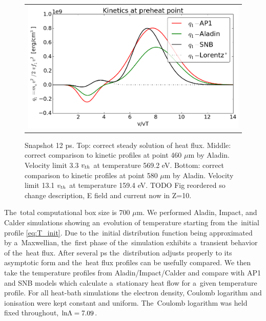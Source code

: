\begin{figure}[htb]
\begin{center}
\begin{tabular}{c}
      \includegraphics[width=\figscale\textwidth]{../VFPdata/C7_Aladin_case3_nonlocal_kinetics.png}  
    \end{tabular}
  \caption{  
  Snapshot 12 ps. Top: correct steady solution of heat flux.  
  Middle: correct comparison to kinetic profiles at point 460 $\mu$m by Aladin. 
  Velocity limit 3.3 $v_{th}$ at temperature 569.2 eV.
  Bottom: correct comparison to kinetic profiles at point 580 $\mu$m by Aladin.
  Velocity limit 13.1 $v_{th}$ at temperature 159.4 eV.
  TODO Fig reordered so change description, E field and current now in Z=10. 
  }
  \label{fig:C7_Aladin_case3}
  \end{center} 
\end{figure}


The~total computational box size is 700 $\mu$m.
We performed Aladin, Impact, and Calder simulations showing an~evolution of
temperature starting from the~initial profile \eqref{eq:T_init}. 
Due to the~initial distribution function being approximated by a~Maxwellian,
the~first phase of the~simulation exhibits a~transient behavior of the~heat
flux. After several ps the~distribution adjusts properly to its asymptotic form
and the~heat flux profiles can be usefully compared. 
We then take the temperature profiles from Aladin/Impact/Calder and compare 
with AP1 and SNB models which calculate a~stationary heat flow
for a~given temperature profile. 
For all heat-bath simulations the electron density, Coulomb logarithm and 
ionisation were kept constant and uniform.
The~Coulomb logarithm was held fixed throughout, $\text{ln}\Lambda = 7.09$.

